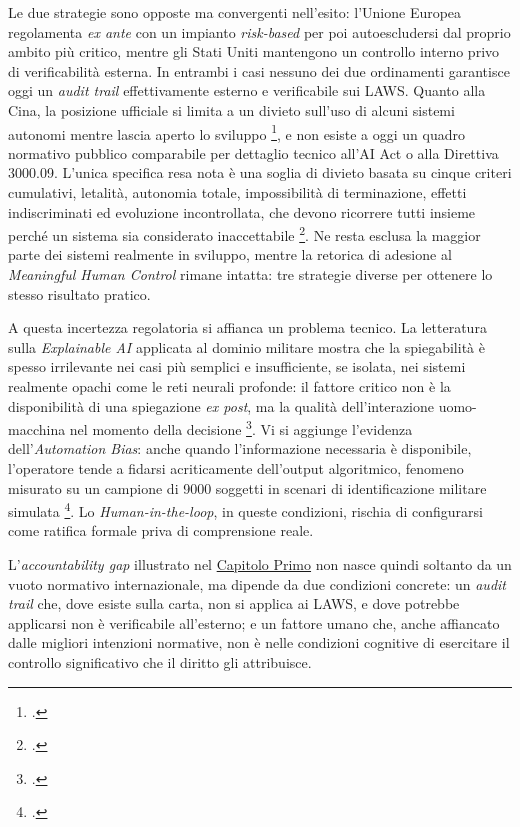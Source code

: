 \ifstampa\documentclass[a4paper,12pt,twoside,openright]{report}\else\documentclass[a4paper,12pt]{report}\fi
\begin{document}
Le due strategie sono opposte ma convergenti nell'esito: l'Unione Europea
regolamenta \textit{ex ante} con un impianto \textit{risk-based} per poi
autoescludersi dal proprio ambito più critico, mentre gli Stati Uniti mantengono
un controllo interno privo di verificabilità esterna. In entrambi i casi nessuno
dei due ordinamenti garantisce oggi un \textit{audit trail} effettivamente
esterno e verificabile sui LAWS. Quanto alla Cina, la posizione ufficiale si
limita a un divieto sull'uso di alcuni sistemi autonomi mentre lascia aperto lo
sviluppo \footcite[p.~4]{wareham_2020}, e non esiste a oggi un quadro normativo
pubblico comparabile per dettaglio tecnico all'AI Act o alla Direttiva 3000.09.
L'unica specifica resa nota è una soglia di divieto basata su cinque criteri
cumulativi, letalità, autonomia totale, impossibilità di terminazione, effetti
indiscriminati ed evoluzione incontrollata, che devono ricorrere tutti insieme
perché un sistema sia considerato inaccettabile \footcite{mako_2026_china_mhc}.
Ne resta esclusa la maggior parte dei sistemi realmente in sviluppo, mentre la
retorica di adesione al \textit{Meaningful Human Control} rimane intatta: tre
strategie diverse per ottenere lo stesso risultato pratico.

A questa incertezza regolatoria si affianca un problema tecnico. La letteratura
sulla \textit{Explainable AI} applicata al dominio militare mostra che la
spiegabilità è spesso irrilevante nei casi più semplici e insufficiente, se
isolata, nei sistemi realmente opachi come le reti neurali profonde: il fattore
critico non è la disponibilità di una spiegazione \textit{ex post}, ma la qualità
dell'interazione uomo-macchina nel momento della decisione
\footcite{wood_2024_xai}. Vi si aggiunge l'evidenza dell'\textit{Automation
Bias}: anche quando l'informazione necessaria è disponibile, l'operatore tende a
fidarsi acriticamente dell'output algoritmico, fenomeno misurato su un campione
di 9000 soggetti in scenari di identificazione militare simulata
\footcite{horowitz_kahn_2024}. Lo \textit{Human-in-the-loop}, in queste
condizioni, rischia di configurarsi come ratifica formale priva di comprensione
reale.

L'\textit{accountability gap} illustrato nel \hyperref[cap1]{Capitolo Primo} non nasce quindi
soltanto da un vuoto normativo internazionale, ma dipende da due condizioni
concrete: un \textit{audit trail} che, dove esiste sulla carta, non si applica ai
LAWS, e dove potrebbe applicarsi non è verificabile all'esterno; e un fattore
umano che, anche affiancato dalle migliori intenzioni normative, non è nelle
condizioni cognitive di esercitare il controllo significativo che il diritto gli
attribuisce.
\end{document}
